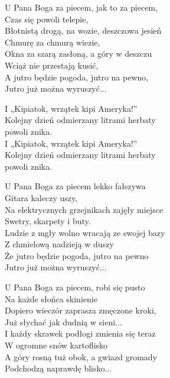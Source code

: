 \begin{text}
    \small{
    U Pana Boga za piecem, jak to za piecem,\\
    Czas się powoli telepie,\\
    Błotnistą drogą, na wozie, deszczowa jesień\\
    Chmurę za chmurą wiezie,\\
    Okna za szarą zasłoną, a góry w deszczu\\
    Wciąż nie przestają kusić,\\
    A jutro będzie pogoda, jutro na pewno,\\
    Jutro już można wyruszyć...

    \vin I „Kipiatok, wrzątek kipi Ameryka!”\\
    \vin Kolejny dzień odmierzany litrami herbaty\\
	\vin powoli znika.\\
    \vin I „Kipiatok, wrzątek kipi Ameryka!”\\
    \vin Kolejny dzień odmierzany litrami herbaty\\
	\vin powoli znika.

    U Pana Boga za piecem lekko fałszywa\\
    Gitara kaleczy uszy,\\
    Na elektrycznych grzejnikach zajęły miejsce\\
    Swetry, skarpety i buty.\\
    Ludzie z mgły wolno wracają ze swojej bazy\\
    Z chmielową nadzieją w duszy\\
    Że jutro będzie pogoda, jutro na pewno\\
    Jutro już można wyruszyć...

    U Pana Boga za piecem, robi się pusto\\
    Na każde słońca skinienie\\
    Dopiero wieczór zaprasza zmęczone kroki,\\
    Już słychać jak dudnią w sieni...\\
    I każdy skrawek podłogi zmienia się teraz\\
    W ogromne snów kartoflisko\\
    A góry rosną tuż obok, a gwiazd gromady\\
    Podchodzą naprawdę blisko...
    }
\end{text}
